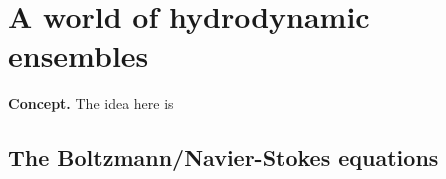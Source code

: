 \chapter{\sffamily A world of hydrodynamic ensembles}

{\bfseries\sffamily Concept.} The idea here is 


\section{\sffamily The Boltzmann/Navier-Stokes equations}